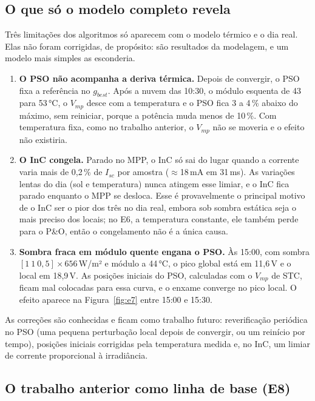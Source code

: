 \documentclass[3p,authoryear]{elsarticle}
\begin{document}
\subsection{O que só o modelo completo revela}
\label{sec:d17}

Três limitações dos algoritmos só aparecem com o modelo térmico e o dia real. Elas não foram
corrigidas, de propósito: são resultados da modelagem, e um modelo mais simples as
esconderia.
\begin{enumerate}[label=(\roman*)]
\item \textbf{O PSO não acompanha a deriva térmica.} Depois de convergir, o PSO fixa a
referência no $g_{best}$. Após a nuvem das 10:30, o módulo esquenta de 43 para 53\,°C, o
$V_{mp}$ desce com a temperatura e o PSO fica 3 a 4\,\% abaixo do máximo, sem reiniciar,
porque a potência muda menos de 10\,\%. Com temperatura fixa, como no trabalho anterior, o
$V_{mp}$ não se moveria e o efeito não existiria.
\item \textbf{O InC congela.} Parado no MPP, o InC só sai do lugar quando a corrente varia
mais de 0,2\,\% de $I_{sc}$ por amostra ($\approx$18\,mA em 31\,ms). As variações lentas do
dia (sol e temperatura) nunca atingem esse limiar, e o InC fica parado enquanto o MPP se
desloca. Esse é provavelmente o principal motivo de o InC ser o pior dos três no dia real,
embora sob sombra estática seja o mais preciso dos locais; no E6, a temperatura constante,
ele também perde para o P\&O, então o congelamento não é a única causa.
\item \textbf{Sombra fraca em módulo quente engana o PSO.} Às 15:00, com sombra
$[1\ 1\ 0{,}5]\times656$\,W/m² e módulo a 44\,°C, o pico global está em 11,6\,V e o local em
18,9\,V. As posições iniciais do PSO, calculadas com o $V_{mp}$ de STC, ficam mal colocadas
para essa curva, e o enxame converge no pico local. O efeito aparece na
Figura~\ref{fig:e7} entre 15:00 e 15:30.
\end{enumerate}
As correções são conhecidas e ficam como trabalho futuro: reverificação periódica no PSO
(uma pequena perturbação local depois de convergir, ou um reinício por tempo), posições
iniciais corrigidas pela temperatura medida e, no InC, um limiar de corrente proporcional à
irradiância.

\subsection{O trabalho anterior como linha de base (E8)}
\label{sec:e8}
\end{document}
